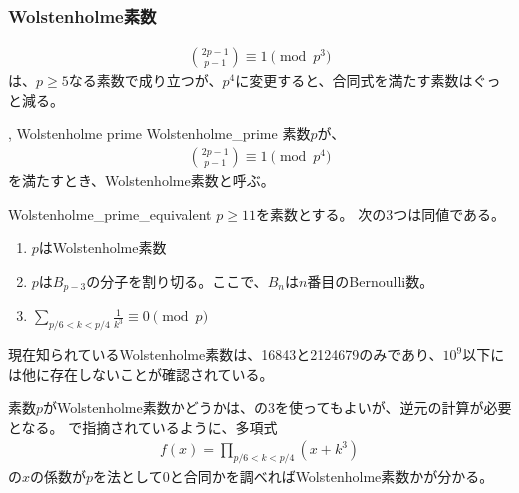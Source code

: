 \subsubsection{Wolstenholme素数}

\begin{align*}
{2p-1 \choose p-1} \equiv 1 \pmod{p^3}
\end{align*}
は、$p\ge5$なる素数で成り立つが、$p^4$に変更すると、合同式を満たす素数はぐっと減る。

\begin{Defi}{, Wolstenholme prime \cite{RichardJ1995}}{Wolstenholme_prime}
素数$p$が、
\begin{align*}
{2p-1 \choose p-1} \equiv 1 \pmod{p^4}
\end{align*}
を満たすとき、Wolstenholme素数と呼ぶ。
\end{Defi}

\begin{Theo}{\cite{RichardJ1995}}{Wolstenholme_prime_equivalent}
$p\ge11$を素数とする。
次の3つは同値である。
\begin{enumerate}
 \item $p$はWolstenholme素数
 \item $p$は$B_{p-3}$の分子を割り切る。ここで、$B_n$は$n$番目のBernoulli数。
 \item $\sum_{p/6<k<p/4}\frac{1}{k^3} \equiv 0 \pmod{p}$
\end{enumerate}
\end{Theo}

現在知られているWolstenholme素数は、16843と2124679のみであり、$10^9$以下には他に存在しないことが確認されている\cite{McIntosh2007ASF}。

素数$p$がWolstenholme素数かどうかは、の3を使ってもよいが、逆元の計算が必要となる。
\cite{McIntosh2007ASF}で指摘されているように、多項式
\begin{align*}
f(x) = \prod_{p/6<k<p/4} (x+k^3)
\end{align*}
の$x$の係数が$p$を法として0と合同かを調べればWolstenholme素数かが分かる。

